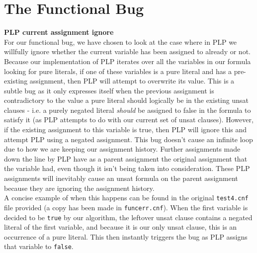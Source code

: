 \documentclass[a4paper]{article}
\begin{document}
\section{The Functional Bug}


\textbf{PLP current assignment ignore} \\

For our functional bug, we have chosen to look at the case where in PLP we willfully ignore whether the current variable has been assigned to already or not. Because our implementation of PLP iterates over all the variables in our formula looking for pure literals, if one of these variables is a pure literal and has a pre-existing assignment, then PLP will attempt to overwrite its value. This is a subtle bug as it only expresses itself when the previous assignment is contradictory to the value a pure literal should logically be in the existing unsat clauses - i.e. a purely negated literal \textit{should} be assigned to false in the formula to satisfy it (as PLP attempts to do with our current set of unsat clauses). However, if the existing assignment to this variable is true, then PLP will ignore this and attempt PLP using a negated assignment. This bug doesn't cause an infinite loop due to how we are keeping our assignment history. Further assignments made down the line by PLP have as a parent assignment the original assignment that the variable had, even though it isn't being taken into consideration. These PLP assignments will inevitably cause an unsat formula on the parent assignment because they are ignoring the assignment history. \\

A concise example of when this happens can be found in the original \texttt{test4.cnf} file provided (a copy has been made in \texttt{funcerr.cnf}). When the first variable is decided to be \texttt{true} by our algorithm, the leftover unsat clause contains a negated literal of the first variable, and because it is our only unsat clause, this is an occurrence of a pure literal. This then instantly triggers the bug as PLP assigns that variable to \texttt{false}.
\end{document}
